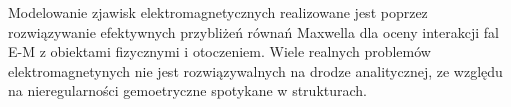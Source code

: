 Modelowanie zjawisk elektromagnetycznych realizowane jest poprzez rozwiązywanie efektywnych przybliżeń równań Maxwella dla oceny interakcji fal E-M z obiektami fizycznymi i otoczeniem. Wiele realnych problemów elektromagnetynych nie jest rozwiązywalnych na drodze analitycznej, ze względu na nieregularności gemoetryczne spotykane w strukturach. 

